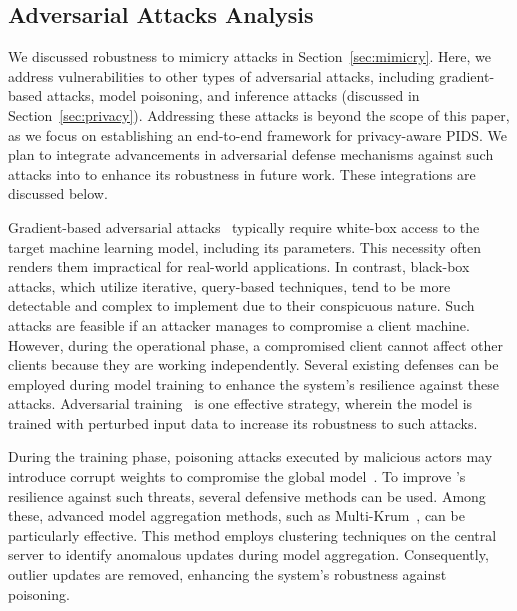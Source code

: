\subsection{Adversarial Attacks Analysis}
\label{sec:adversarial}

We discussed robustness to mimicry attacks in Section~\ref{sec:mimicry}. Here, we address vulnerabilities to other types of adversarial attacks, including gradient-based attacks, model poisoning, and inference attacks (discussed in Section~\ref{sec:privacy}). Addressing these attacks is beyond the scope of this paper, as we focus on establishing an end-to-end framework for privacy-aware PIDS. We plan to integrate advancements in adversarial defense mechanisms against such attacks into \Sys to enhance its robustness in future work. These integrations are discussed below.

 Gradient-based adversarial attacks~\cite{chakraborty2021survey} typically require white-box access to the target machine learning model, including its parameters. This necessity often renders them impractical for real-world applications. In contrast, black-box attacks, which utilize iterative, query-based techniques, tend to be more detectable and complex to implement due to their conspicuous nature. Such attacks are feasible if an attacker manages to compromise a client machine. However, during the operational phase, a compromised client cannot affect other clients because they are working independently. Several existing defenses can be employed during model training to enhance the system's resilience against these attacks. Adversarial training~\cite{tramer2019adversarial} is one effective strategy, wherein the model is trained with perturbed input data to increase its robustness to such attacks.

 During the training phase, poisoning attacks executed by malicious actors may introduce corrupt weights to compromise the global model~\cite{jagielski2018manipulating}. To improve \Sys's resilience against such threats, several defensive methods can be used. Among these, advanced model aggregation methods, such as Multi-Krum~\cite{munoz2019byzantine}, can be particularly effective. This method employs clustering techniques on the central server to identify anomalous updates during model aggregation. Consequently, outlier updates are removed, enhancing the system's robustness against poisoning.

